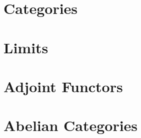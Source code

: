 \documentclass[../../deep-dive]{subfiles}
\begin{document}
\chapter{Categories}





\chapter{Limits}



\chapter{Adjoint Functors}



\chapter{Abelian Categories}




% 
\end{document}
